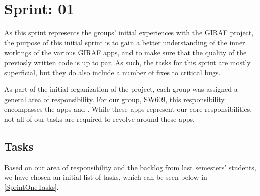 \chapter{Sprint: 01}
As this sprint represents the groups' initial experiences with the GIRAF
project, the purpose of this initial sprint is to gain a better understanding of
the inner workings of the various GIRAF apps, and to make sure that the quality
of the previosly written code is up to par. As such, the tasks for this sprint
are mostly superficial, but they do also include a number of fixes to critical
bugs.\nl

As part of the initial organization of the project, each group was assigned a
general area of responsibility. For our group, SW609, this responsibility
encompasses the apps  and . While
these apps represent our core responsibilities, not all of our tasks are
required to revolve around these apps.

\section{Tasks}
Based on our area of responsibility and the backlog from last semesters'
students, we have chosen an initial list of tasks, which can be seen below in
\autoref{SprintOneTasks}. 

